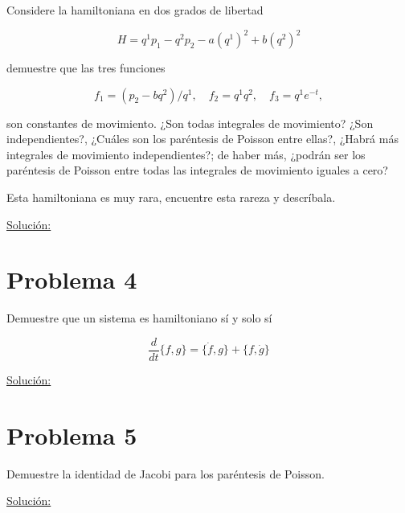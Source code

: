 \documentclass[a4paper,10pt]{article}
\numberwithin{equation}{section}
\begin{document}
Considere la hamiltoniana en dos grados de libertad 

$$
H = q^1p_1 - q^2p_2 - a(q^1)^2 + b(q^2)^2
$$

demuestre que las tres funciones 

$$
f_1 = (p_2 - bq^2)/q^1, \quad f_2 = q^1q^2, \quad f_3=q^1e^{-t},
$$

son constantes de movimiento. ¿Son todas integrales de movimiento? ¿Son independientes?, 
¿Cuáles son los paréntesis de Poisson entre ellas?, ¿Habrá más integrales de movimiento 
independientes?; de haber más, ¿podrán ser los paréntesis de Poisson entre todas 
las integrales de movimiento iguales a cero?

\vspace{.3cm}

Esta hamiltoniana es muy rara, encuentre esta rareza y descríbala.

\vspace{.3cm}

\underline{Solución:} \vspace{.3cm}

\section{Problema 4}

Demuestre que un sistema es hamiltoniano sí y solo sí

$$
\frac{d}{dt}\{f,g\} = \{\dot{f},g\} + \{f,\dot{g}\}
$$

\vspace{.3cm}

\underline{Solución:} \vspace{.3cm}

\section{Problema 5}

Demuestre la identidad de Jacobi para los paréntesis de Poisson.

\vspace{.3cm}

\underline{Solución:} \vspace{.3cm}
\end{document}
